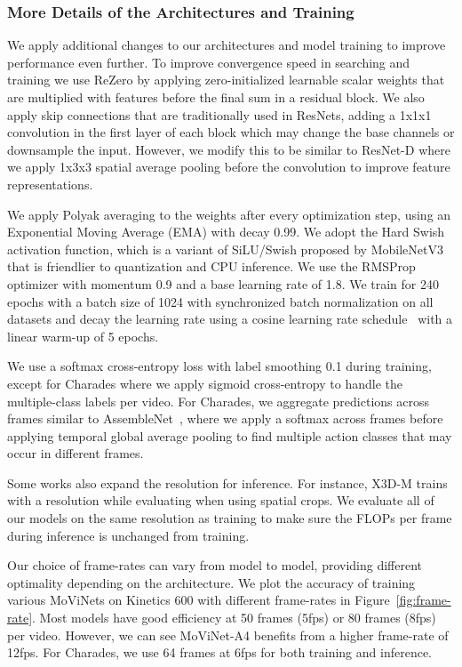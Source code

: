 \documentclass[final]{cvpr}
\newcommand{\ournet}{MoViNet\xspace} \newcommand{\ournets}{\ournet{}s\xspace}
\begin{document}
\subsubsection{More Details of the Architectures and Training}

We apply additional changes to our architectures and model training to improve performance even further.
To improve convergence speed in searching and training we use ReZero \cite{bachlechner2020rezero} by applying zero-initialized learnable scalar weights that are multiplied with features before the final sum in a residual block.
We also apply skip connections that are traditionally used in ResNets, adding a 1x1x1 convolution in the first layer of each block which may change the base channels or downsample the input.
However, we modify this to be similar to ResNet-D \cite{he2019bag} where we apply 1x3x3 spatial average pooling before the convolution to improve feature representations.


We apply Polyak averaging \cite{polyak1992acceleration} to the weights after every optimization step, using an Exponential Moving Average (EMA) with decay 0.99.
We adopt the Hard Swish activation function, which is a variant of SiLU/Swish \cite{elfwing2018sigmoid, ramachandran2017searching} proposed by MobileNetV3 \cite{howard2019searching} that is friendlier to quantization and CPU inference. We use the RMSProp optimizer with momentum 0.9 and a base learning rate of 1.8. 
We train for 240 epochs with a batch size of 1024 with synchronized batch normalization on all datasets and decay the learning rate using a cosine learning rate schedule~\cite{loshchilov2016sgdr} with a linear warm-up of 5 epochs.

We use a softmax cross-entropy loss with label smoothing 0.1 during training, except for Charades where we apply sigmoid cross-entropy to handle the multiple-class labels per video.
For Charades, we aggregate predictions across frames similar to AssembleNet~\cite{ryoo2019assemblenet}, where we apply a softmax across frames before applying temporal global average pooling to find multiple action classes that may occur in different frames.

Some works also expand the resolution for inference. For instance, X3D-M trains with a  resolution while evaluating  when using spatial crops.
We evaluate all of our models on the same resolution as training to make sure the FLOPs per frame during inference is unchanged from training.

Our choice of frame-rates can vary from model to model, providing different optimality depending on the architecture.
We plot the accuracy of training various \ournets on Kinetics 600 with different frame-rates in Figure~\ref{fig:frame-rate}.
Most models have good efficiency at 50 frames (5fps) or 80 frames (8fps) per video.
However, we can see \ournet-A4 benefits from a higher frame-rate of 12fps.
For Charades, we use 64 frames at 6fps for both training and inference.
\end{document}
